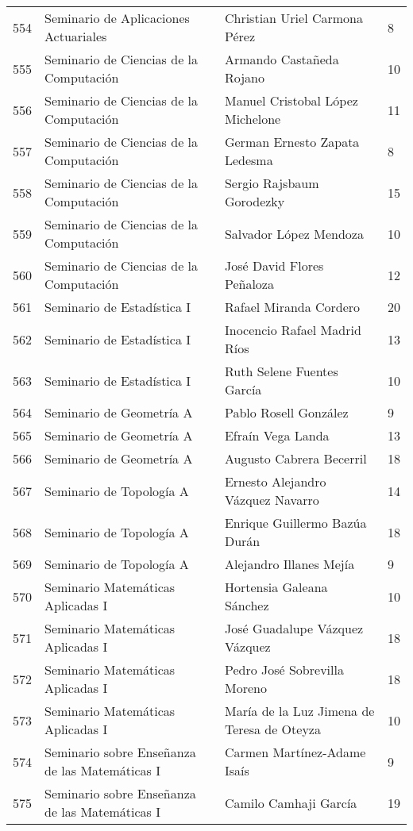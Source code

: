 \begin{table}[ht]
\begin{tabular}{rlll}
  554 & Seminario de Aplicaciones Actuariales & Christian Uriel Carmona Pérez & 8 \\ 
  555 & Seminario de Ciencias de la Computación & Armando Castañeda Rojano & 10 \\ 
  556 & Seminario de Ciencias de la Computación & Manuel Cristobal López Michelone & 11 \\ 
  557 & Seminario de Ciencias de la Computación & German Ernesto Zapata Ledesma & 8 \\ 
  558 & Seminario de Ciencias de la Computación & Sergio Rajsbaum Gorodezky & 15 \\ 
  559 & Seminario de Ciencias de la Computación & Salvador López Mendoza & 10 \\ 
  560 & Seminario de Ciencias de la Computación & José David Flores Peñaloza & 12 \\ 
  561 & Seminario de Estadística I & Rafael Miranda Cordero & 20 \\ 
  562 & Seminario de Estadística I & Inocencio Rafael Madrid Ríos & 13 \\ 
  563 & Seminario de Estadística I & Ruth Selene Fuentes García & 10 \\ 
  564 & Seminario de Geometría A & Pablo Rosell González & 9 \\ 
  565 & Seminario de Geometría A & Efraín Vega Landa & 13 \\ 
  566 & Seminario de Geometría A & Augusto Cabrera Becerril & 18 \\ 
  567 & Seminario de Topología A & Ernesto Alejandro Vázquez Navarro & 14 \\ 
  568 & Seminario de Topología A & Enrique Guillermo Bazúa Durán & 18 \\ 
  569 & Seminario de Topología A & Alejandro Illanes Mejía & 9 \\ 
  570 & Seminario Matemáticas Aplicadas I & Hortensia Galeana Sánchez & 10 \\ 
  571 & Seminario Matemáticas Aplicadas I & José Guadalupe Vázquez Vázquez & 18 \\ 
  572 & Seminario Matemáticas Aplicadas I & Pedro José Sobrevilla Moreno & 18 \\ 
  573 & Seminario Matemáticas Aplicadas I & María de la Luz Jimena de Teresa de Oteyza & 10 \\ 
  574 & Seminario sobre Enseñanza de las Matemáticas I & Carmen Martínez-Adame Isaís & 9 \\ 
  575 & Seminario sobre Enseñanza de las Matemáticas I & Camilo Camhaji García & 19 \\ 

\end{tabular}
\end{table}
